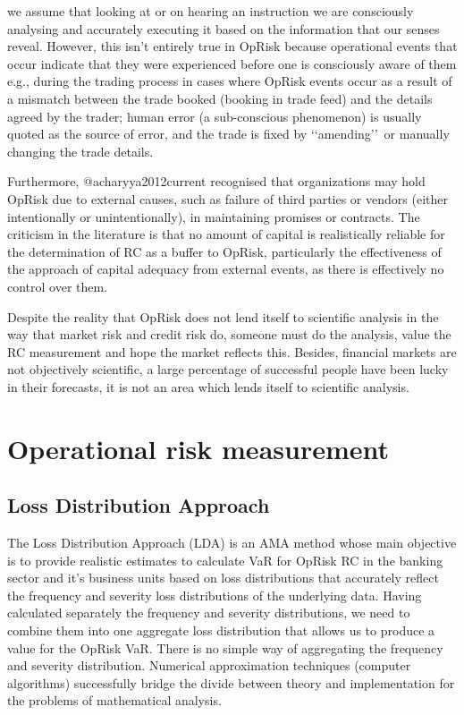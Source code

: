 \documentclass[]{article}
\begin{document}
we assume that looking at or on hearing an instruction we are
consciously analysing and accurately executing it based on the
information that our senses reveal. However, this isn't entirely true in
OpRisk because operational events that occur indicate that they were
experienced before one is consciously aware of them e.g., during the
trading process in cases where OpRisk events occur as a result of a
mismatch between the trade booked (booking in trade feed) and the
details agreed by the trader; human error (a sub-conscious phenomenon)
is usually quoted as the source of error, and the trade is fixed by
\lq\lq amending\rq\rq~or manually changing the trade details. \medskip

Furthermore, @acharyya2012current recognised that organizations may hold
OpRisk due to external causes, such as failure of third parties or
vendors (either intentionally or unintentionally), in maintaining
promises or contracts. The criticism in the literature is that no amount
of capital is realistically reliable for the determination of RC as a
buffer to OpRisk, particularly the effectiveness of the approach of
capital adequacy from external events, as there is effectively no
control over them.\medskip

Despite the reality that OpRisk does not lend itself to scientific
analysis in the way that market risk and credit risk do, someone must do
the analysis, value the RC measurement and hope the market reflects
this. Besides, financial markets are not objectively scientific, a large
percentage of successful people have been lucky in their forecasts, it
is not an area which lends itself to scientific analysis.\medskip

\section{Operational risk measurement}
\label{sec:Operational risk measurement}\subsection{Loss Distribution Approach}

The Loss Distribution Approach (LDA) is an AMA method whose main
objective is to provide realistic estimates to calculate VaR for OpRisk
RC in the banking sector and it's business units based on loss
distributions that accurately reflect the frequency and severity loss
distributions of the underlying data. Having calculated separately the
frequency and severity distributions, we need to combine them into one
aggregate loss distribution that allows us to produce a value for the
OpRisk VaR. There is no simple way of aggregating the frequency and
severity distribution. Numerical approximation techniques (computer
algorithms) successfully bridge the divide between theory and
implementation for the problems of mathematical analysis. \medskip
\end{document}
